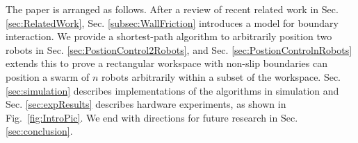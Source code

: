 The paper is arranged as follows. 
After a review of recent related work in Sec.  \ref{sec:RelatedWork},
  Sec.  \ref{subsec:WallFriction} introduces a  model for boundary interaction.  
We provide a shortest-path algorithm to arbitrarily position two robots in Sec.  \ref{sec:PostionControl2Robots}, and Sec.  \ref{sec:PostionControlnRobots} extends this to prove a rectangular workspace with non-slip boundaries can position a swarm of $n$ robots arbitrarily within a subset of the workspace.
Sec.  \ref{sec:simulation} describes implementations of the algorithms in simulation and  Sec.  \ref{sec:expResults} describes hardware experiments, as shown in Fig.~\ref{fig:IntroPic}. 
 We end with directions for future research in Sec.  \ref{sec:conclusion}.




